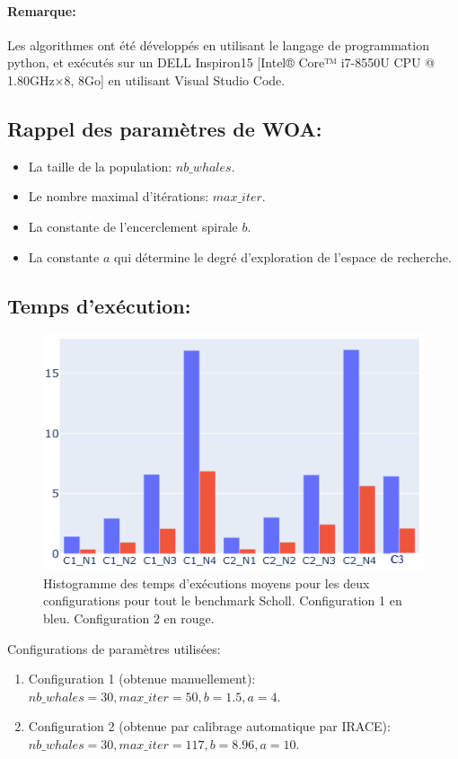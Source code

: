 \documentclass[12pt]{article}
\begin{document}
\paragraph{Remarque: }
Les algorithmes ont été développés en utilisant le langage de programmation python, et exécutés sur un DELL Inspiron15 [Intel® Core™ i7-8550U CPU @ 1.80GHz×8, 8Go] en utilisant Visual Studio Code.
\subsection{Rappel des paramètres de WOA: }
\begin{itemize}
    \item La taille de la population: \(nb\_whales\).
    \item Le nombre maximal d’itérations: \(max\_iter\).
    \item La constante de l’encerclement spirale \(b\).
    \item La constante \(a\) qui détermine le degré d’exploration de l’espace de recherche.
\end{itemize}
\subsection{Temps d'exécution: }
\begin{figure}[!hbt]
    \includegraphics[width=\linewidth]{../figures/WOA/woa_texec.png}
    \caption{Histogramme des temps d'exécutions moyens pour les deux configurations pour tout le benchmark Scholl. Configuration 1 en bleu. Configuration 2 en rouge.}
\end{figure}
Configurations de paramètres utilisées:
\begin{enumerate}
    \item Configuration 1 (obtenue manuellement): \(nb\_whales=30, max\_iter=50, b=1.5, a=4\).
    \item Configuration 2 (obtenue par calibrage automatique par IRACE): \( nb\_whales=30, max\_iter=117, b=8.96, a=10\).
\end{enumerate}
\end{document}
